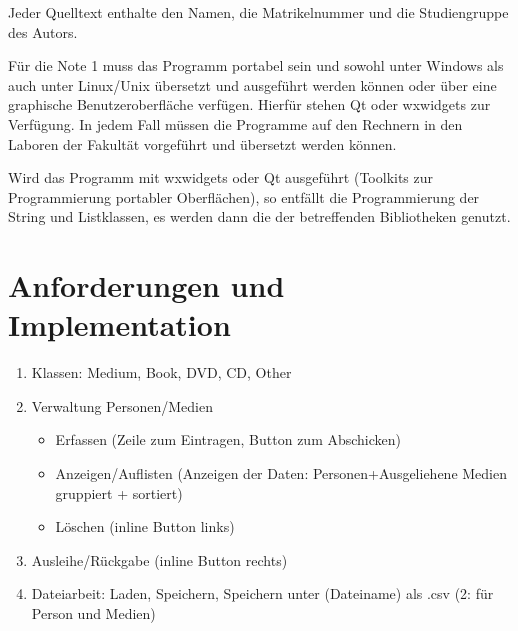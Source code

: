 Jeder Quelltext enthalte den Namen, die Matrikelnummer und die Studiengruppe des Autors.

Für die Note 1 muss das Programm portabel sein und sowohl unter Windows als auch unter Linux/Unix übersetzt und ausgeführt werden können oder über eine graphische Benutzeroberfläche verfügen. Hierfür stehen Qt oder wxwidgets zur Verfügung. In jedem Fall müssen die Programme auf den Rechnern in den Laboren der Fakultät vorgeführt und übersetzt werden können.

Wird das Programm mit wxwidgets oder Qt ausgeführt (Toolkits zur Programmierung portabler Oberflächen), so entfällt die Programmierung der String und Listklassen, es werden dann die der betreffenden Bibliotheken genutzt.

\section*{Anforderungen und Implementation}
\begin{enumerate}
\item Klassen: Medium, Book, DVD, CD, Other
\item Verwaltung Personen/Medien
\begin{itemize}
\item Erfassen (Zeile zum Eintragen, Button zum Abschicken)
\item Anzeigen/Auflisten (Anzeigen der Daten: Personen+Ausgeliehene Medien gruppiert + sortiert)
\item Löschen (inline Button links)
\end{itemize}
\item Ausleihe/Rückgabe (inline Button rechts)
\item Dateiarbeit: Laden, Speichern, Speichern unter (Dateiname) als .csv (2: für Person und Medien)
\end{enumerate}



